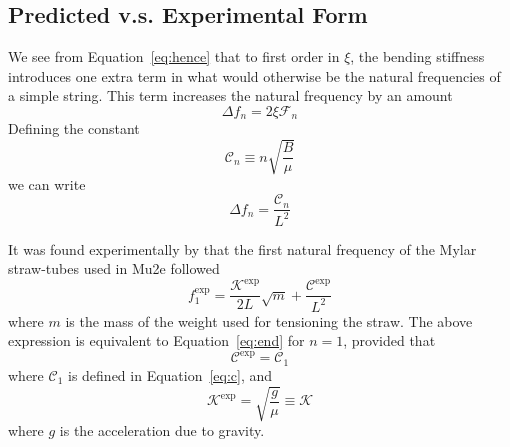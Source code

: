 \documentclass[twoside]{article}
\begin{document}
\begin{multicols}{2}







\subsection{Predicted v.s. Experimental Form}
We see from Equation~\ref{eq:hence} that to first order in $\xi$, the bending stiffness introduces one extra term in what would otherwise be the natural frequencies of a simple string. This term increases the natural frequency by an amount
\begin{equation}
\Delta f_n =  2 \xi \mathcal{F}_n
\end{equation}
Defining the constant 
\begin{equation}
\mathcal{C}_n \equiv n \sqrt{\frac{B}{\mu}}
\label{eq:c}
\end{equation}
we can write
\begin{equation}
\Delta f_n =  \frac{\mathcal{C}_n}{L^2}
\end{equation}


It was found experimentally by \cite{david} that the first natural frequency of the Mylar straw-tubes used in Mu2e followed 
\begin{equation}
\boxed{
	f^\text{exp}_1 = \frac{\mathcal{K}^\text{exp}}{2L}\sqrt{m} + \frac{\mathcal{C}^\text{exp}}{L^2}
}
\end{equation}
where $m$ is the mass of the weight used for tensioning the straw.  The above expression is equivalent to Equation~\ref{eq:end} for $n=1$, provided that
\begin{equation}
	\mathcal{C}^\text{exp} = \mathcal{C}_1
\end{equation}
where $\mathcal{C}_1$ is defined in Equation~\ref{eq:c},
and 
\begin{equation}
\mathcal{K}^\text{exp} = \sqrt{\frac{g}{\mu}} \equiv \mathcal{K} 
\end{equation}
where $g$ is the acceleration due to gravity.



\end{multicols}
\end{document}
